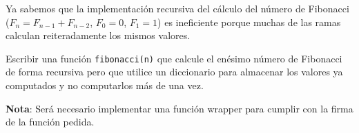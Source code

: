 \begin{ejercicio}
Ya sabemos que la implementación recursiva del cálculo del número de Fibonacci
($F_n = F_{n-1} + F_{n-2}$, $F_0 = 0$, $F_1 = 1$)
es ineficiente porque muchas de las ramas calculan reiteradamente los mismos
valores.

Escribir una función \lstinline!fibonacci(n)! que calcule el enésimo número
de Fibonacci de forma recursiva pero que utilice un diccionario para almacenar
los valores ya computados y no computarlos más de una vez.

{\bf Nota}: Será necesario implementar una función wrapper para cumplir con la
firma de la función pedida.
\end{ejercicio}
